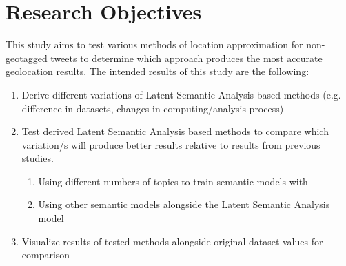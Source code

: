 \section{Research Objectives}
This study aims to test various methods of location approximation for non-geotagged tweets  to determine which approach produces the most accurate geolocation results. The intended results of this study are the following: 

\begin{enumerate}
    \item Derive different variations of Latent Semantic Analysis based methods (e.g. difference in datasets, changes in computing/analysis process)
    \item Test derived Latent Semantic Analysis based methods to compare which variation/s will produce better results relative to results from previous studies.
    \begin{enumerate}[-]
     \item Using different numbers of topics to train semantic models with
     \item Using other semantic models alongside the Latent Semantic Analysis model
    \end{enumerate}
    \item Visualize results of tested methods alongside original dataset values for comparison
\end{enumerate}

